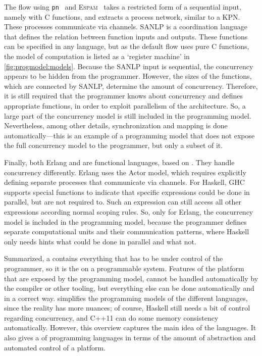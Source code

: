 The flow using \texttt{pn}~\cite{verdoolaege:pn} and \textsc{Espam}~\cite{nikolov:systematic_design} takes a restricted form of a sequential input, namely  with C functions, and extracts a process network, similar to a \ac{KPN}.
These processes communicate via channels.
\Ac{SANLP} is a coordination language~\cite{lee:problem_with_threads} that defines the relation between function inputs and outputs.
These functions can be specified in any language, but as the default flow uses pure C functions, the model of computation is listed as a `register machine' in \vref{fig:progmodel:models}.
Because the \ac{SANLP} input is sequential, the concurrency appears to be hidden from the programmer.
However, the sizes of the functions, which are connected by \ac{SANLP}, determine the amount of concurrency.
Therefore, it is still required that the programmer knows about concurrency and defines appropriate functions, in order to exploit parallelism of the architecture.
So, a large part of the concurrency model is still included in the programming model.
Nevertheless, among other details, synchronization and mapping is done automatically---this is an example of a programming model that does not expose the full concurrency model to the programmer, but only a subset of it.

Finally, both Erlang and  are functional languages, based on \lcalc*.
They handle concurrency differently.
Erlang uses the Actor model, which requires explicitly defining separate processes that communicate via channels.
For Haskell, \ac{GHC} supports special functions to indicate that specific expressions could be done in parallel, but are not required to.
Such an expression can still access all other expressions according normal scoping rules.
So, only for Erlang, the concurrency model is included in the programming model, because the programmer defines separate computational units and their communication patterns, where Haskell only needs hints what could be done in parallel and what not.

Summarized, a  contains everything that has to be under control of the programmer, so it is the  on a programmable system.
Features of the platform that are exposed by the programming model, cannot be handled automatically by the compiler or other tooling, but everything else can be done automatically and in a correct way.
 simplifies the programming models of the different languages, since the reality has more nuances; of course, Haskell still needs a bit of control regarding concurrency, and C++11 can do some memory consistency automatically.
However, this overview captures the main idea of the languages.
It also gives a  of programming languages in terms of the amount of abstraction and automated control of a platform.



